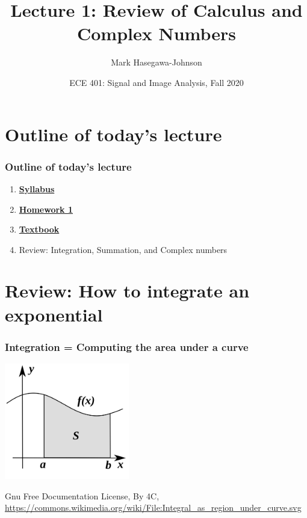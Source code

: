 \documentclass{beamer}
\title{Lecture 1: Review of Calculus and Complex Numbers}
\author{Mark Hasegawa-Johnson}
\date{ECE 401: Signal and Image Analysis, Fall 2020}
\begin{document}
\begin{frame}
  \maketitle
\end{frame}

\begin{frame}
  \tableofcontents
\end{frame}

\section[Outline]{Outline of today's lecture}
\setcounter{subsection}{1}
\begin{frame}
  \frametitle{Outline of today's lecture}
  \begin{enumerate}
  \item \href{https://courses.engr.illinois.edu/ece401/fa2020/\#syllabus}{\bf\color{blue}Syllabus}
  \item \href{https://courses.engr.illinois.edu/ece401/fa2020/hw1.pdf}{\bf\color{blue}Homework 1}
  \item \href{https://www.pearson.com/us/higher-education/program/Mc-Clellan-DSP-First-2nd-Edition/PGM86857.html}{\bf\color{blue}Textbook}
  \item Review: Integration, Summation, and Complex numbers
  \end{enumerate}
\end{frame}

\section[Integration]{Review: How to integrate an exponential}
\setcounter{subsection}{1}

\begin{frame}
  \frametitle{Integration = Computing the area under a  curve}
  \centerline{\includegraphics[height=2in]{fig1.png}}
  \begin{tiny}
    Gnu Free Documentation License, By 4C,
    \url{https://commons.wikimedia.org/wiki/File:Integral_as_region_under_curve.svg}
  \end{tiny}
\end{frame}
\end{document}
